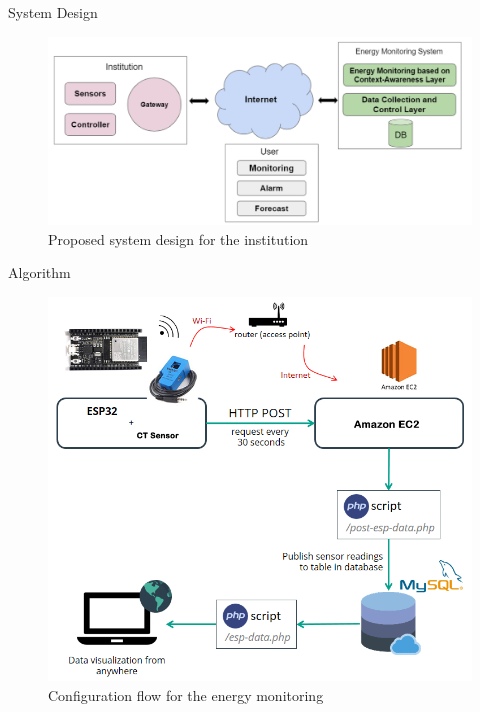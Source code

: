 \documentclass[11pt, aspect ratio=169]{beamer}
\begin{document}
\begin{frame}{System Design}
 \begin{figure}[H]%
\begin {center}
\includegraphics[width=8.5cm=\textwidth]{images/flow1.png}
\caption{Proposed system design for the institution}
\end {center}
\end{figure}

\end{frame}





\begin{frame}{Algorithm}
 \begin{figure}[H]%
\begin {center}
\includegraphics[width=7cm=\textwidth]{images/framework.png}
\caption{Configuration flow for the energy monitoring}
\end {center}
\end{figure}
\end{frame}
\end{document}
